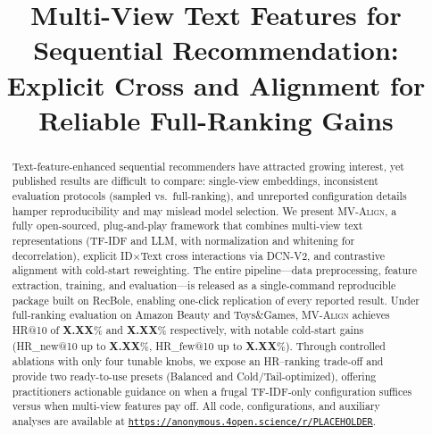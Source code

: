 \documentclass[sigconf,natbib=true,anonymous]{acmart}
\newcommand{\model}{\textsc{MV-Align}\xspace}
\newcommand{\tfidf}{\textsc{TF-IDF}\xspace}
\newcommand{\llm}{\textsc{LLM}\xspace}
\begin{document}
\title{Multi-View Text Features for Sequential Recommendation:\\
Explicit Cross and Alignment for Reliable Full-Ranking Gains}


\begin{abstract}
Text-feature-enhanced sequential recommenders have attracted growing interest, yet published results are difficult to compare: single-view embeddings, inconsistent evaluation protocols (sampled vs.\ full-ranking), and unreported configuration details hamper reproducibility and may mislead model selection.
%
We present \model, a fully open-sourced, plug-and-play framework that combines multi-view text representations (\tfidf and \llm, with normalization and whitening for decorrelation), explicit ID$\times$Text cross interactions via DCN-V2, and contrastive alignment with cold-start reweighting.
%
The entire pipeline---data preprocessing, feature extraction, training, and evaluation---is released as a single-command reproducible package built on RecBole, enabling one-click replication of every reported result.
%
Under full-ranking evaluation on Amazon Beauty and Toys\&Games, \model achieves HR@10 of \textbf{X.XX}\% and \textbf{X.XX}\% respectively, with notable cold-start gains (HR\_new@10 up to \textbf{X.XX}\%, HR\_few@10 up to \textbf{X.XX}\%).
%
Through controlled ablations with only four tunable knobs, we expose an HR--ranking trade-off and provide two ready-to-use presets (Balanced and Cold/Tail-optimized), offering practitioners actionable guidance on when a frugal \tfidf-only configuration suffices versus when multi-view features pay off.
All code, configurations, and auxiliary analyses are available at \texttt{\url{https://anonymous.4open.science/r/PLACEHOLDER}}.
\end{abstract}


\maketitle

\end{document}
